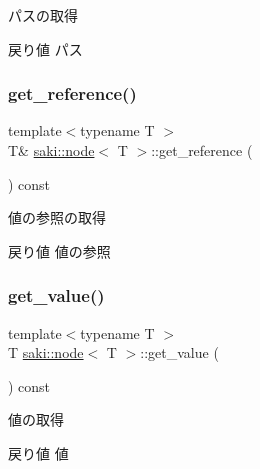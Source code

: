 パスの取得 

\begin{DoxyReturn}{戻り値}
パス 
\end{DoxyReturn}
\mbox{\label{classsaki_1_1node_a2d1c317236e961030482f7d64d0d7905}} 
\subsubsection{\texorpdfstring{get\+\_\+reference()}{get\_reference()}}
{\footnotesize\ttfamily template$<$typename T $>$ \\
T\& \mbox{\hyperlink{classsaki_1_1node}{saki\+::node}}$<$ T $>$\+::get\+\_\+reference (\begin{DoxyParamCaption}{ }\end{DoxyParamCaption}) const\hspace{0.3cm}{\ttfamily [inline]}}



値の参照の取得 

\begin{DoxyReturn}{戻り値}
値の参照 
\end{DoxyReturn}
\mbox{\label{classsaki_1_1node_a1c72cbf0e9180d7573ec664b011784e3}} 
\subsubsection{\texorpdfstring{get\+\_\+value()}{get\_value()}}
{\footnotesize\ttfamily template$<$typename T $>$ \\
T \mbox{\hyperlink{classsaki_1_1node}{saki\+::node}}$<$ T $>$\+::get\+\_\+value (\begin{DoxyParamCaption}{ }\end{DoxyParamCaption}) const\hspace{0.3cm}{\ttfamily [inline]}}



値の取得 

\begin{DoxyReturn}{戻り値}
値 
\end{DoxyReturn}
\mbox{\label{classsaki_1_1node_a56ab805f343c184a938ceb189cd8f1a8}} 
